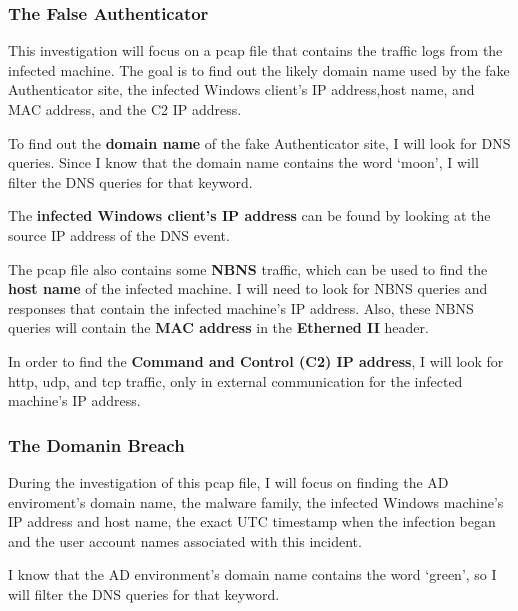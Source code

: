 \documentclass[pdflatex,sn-mathphys-num]{sn-jnl}
\begin{document}
\subsubsection{The False Authenticator}\label{tfa}

\par This investigation will focus on a pcap file that contains the traffic logs from the infected machine. The goal is
to find out the likely domain name used by the fake Authenticator site, the infected Windows client's IP address,host
name, and MAC address, and the C2 IP address.

\par To find out the \textbf{domain name} of the fake Authenticator site, I will look for DNS queries. Since I know that
the domain name contains the word `moon', I will filter the DNS queries for that keyword.

\par The \textbf{infected Windows client's IP address} can be found by looking at the source IP address of the DNS event.

\par The pcap file also contains some \textbf{NBNS} traffic, which can be used to find the \textbf{host name} of the
infected machine. I will need to look for NBNS queries and responses that contain the infected machine's IP address.
Also, these NBNS queries will contain the \textbf{MAC address} in the \textbf{Etherned II} header. 

\par In order to find the \textbf{Command and Control (C2) IP address}, I will look for http, udp, and tcp traffic, only
in external communication for the infected machine's IP address.

\subsubsection{The Domanin Breach}\label{tdb}

\par During the investigation of this pcap file, I will focus on finding the AD enviroment's domain name, the malware
family, the infected Windows machine's IP address and host name, the exact UTC timestamp when the infection began and
the user account names associated with this incident.

\par I know that the AD environment's domain name contains the word `green', so I will filter the DNS queries for that
keyword.
\end{document}
